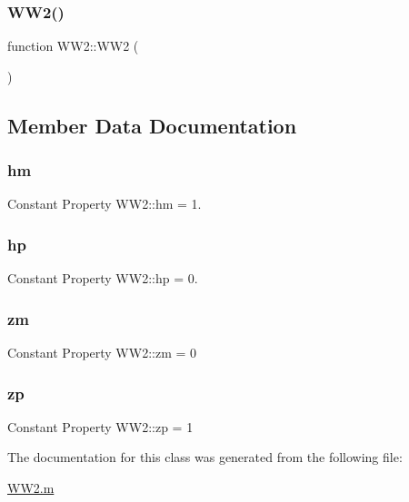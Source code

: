 \subsubsection{\texorpdfstring{W\+W2()}{WW2()}}
{\footnotesize\ttfamily function W\+W2\+::\+W\+W2 (\begin{DoxyParamCaption}{ }\end{DoxyParamCaption})}



\subsection{Member Data Documentation}
\mbox{\label{class_w_w2_aea7dd312041ae265d7444d07db1ef17b}} 
\subsubsection{\texorpdfstring{hm}{hm}}
{\footnotesize\ttfamily Constant Property W\+W2\+::hm = 1.}

\mbox{\label{class_w_w2_a00485f31d922ba9c0a04fc2d4ec34468}} 
\subsubsection{\texorpdfstring{hp}{hp}}
{\footnotesize\ttfamily Constant Property W\+W2\+::hp = 0.}

\mbox{\label{class_w_w2_add7f59c196008cedc40cf9b34b20ff11}} 
\subsubsection{\texorpdfstring{zm}{zm}}
{\footnotesize\ttfamily Constant Property W\+W2\+::zm = 0}

\mbox{\label{class_w_w2_abf68edbbbb168109075633bfd64c8526}} 
\subsubsection{\texorpdfstring{zp}{zp}}
{\footnotesize\ttfamily Constant Property W\+W2\+::zp = 1}



The documentation for this class was generated from the following file\+:\begin{DoxyCompactItemize}
\item 
\hyperlink{_w_w2_8m}{W\+W2.\+m}\end{DoxyCompactItemize}
